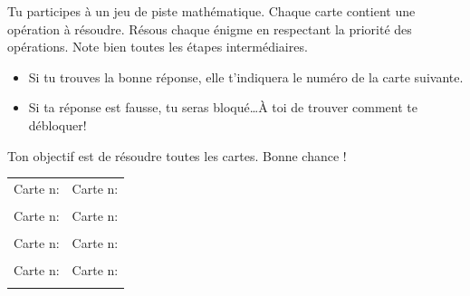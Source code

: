 

\setcounter{Exercice}{0}

Tu participes à un jeu de piste mathématique. Chaque carte contient une opération à résoudre. Résous chaque énigme en respectant la priorité des opérations. Note bien toutes les étapes intermédiaires.

\begin{itemize}[label=$\diamondsuit$]
\item Si tu trouves la bonne réponse, elle t'indiquera le numéro de la carte suivante.
\item Si ta réponse est fausse, tu seras bloqué\ldots À toi de trouver comment te débloquer!
\end{itemize}

Ton objectif est de résoudre toutes les cartes. Bonne chance !

\vfill
\begin{tabularx}{\linewidth}{|X|X|}
\hline
  Carte n\textdegree{}:&Carte n\textdegree{}:\\
  &\\
\hline
  Carte n\textdegree{}:&Carte n\textdegree{}:\\
  &\\
\hline
  Carte n\textdegree{}:&Carte n\textdegree{}:\\
  &\\
\hline
  Carte n\textdegree{}:&Carte n\textdegree{}:\\
  &\\
\hline
\end{tabularx}
